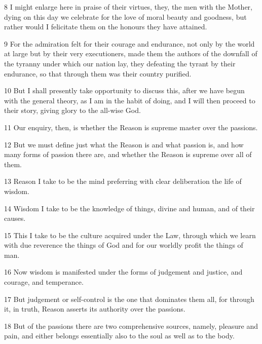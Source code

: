 \par 8 I might enlarge here in praise of their virtues, they, the men with the Mother, dying on this day we celebrate for the love of moral beauty and goodness, but rather would I felicitate them on the honours they have attained.

\par 9 For the admiration felt for their courage and endurance, not only by the world at large but by their very executioners, made them the authors of the downfall of the tyranny under which our nation lay, they defeating the tyrant by their endurance, so that through them was their country purified.

\par 10 But I shall presently take opportunity to discuss this, after we have begun with the general theory, as I am in the habit of doing, and I will then proceed to their story, giving glory to the all-wise God.

\par 11 Our enquiry, then, is whether the Reason is supreme master over the passions.

\par 12 But we must define just what the Reason is and what passion is, and how many forms of passion there are, and whether the Reason is supreme over all of them.

\par 13 Reason I take to be the mind preferring with clear deliberation the life of wisdom.

\par 14 Wisdom I take to be the knowledge of things, divine and human, and of their causes.

\par 15 This I take to be the culture acquired under the Law, through which we learn with due reverence the things of God and for our worldly profit the things of man.

\par 16 Now wisdom is manifested under the forms of judgement and justice, and courage, and temperance.

\par 17 But judgement or self-control is the one that dominates them all, for through it, in truth, Reason asserts its authority over the passions.

\par 18 But of the passions there are two comprehensive sources, namely, pleasure and pain, and either belongs essentially also to the soul as well as to the body.

